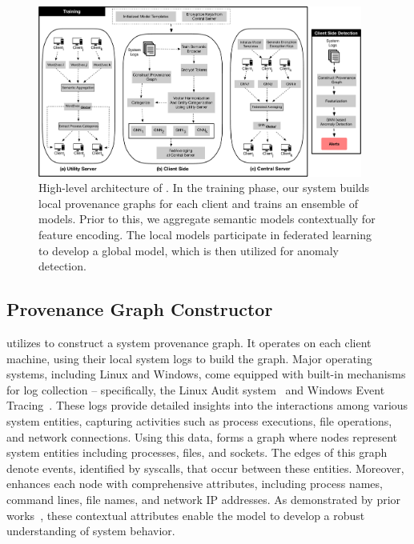 
\begin{figure}[t!]
  \centering
  \includegraphics[width=0.95\textwidth]{fig/archv3.pdf}
  \caption{High-level architecture of \Sys. In the training phase, our system builds local provenance graphs for each client and trains an ensemble of \gnnshort models. Prior to this, we aggregate semantic models contextually for feature encoding. The local \gnnshort models participate in federated learning to develop a global \gnnshort model, which is then utilized for anomaly detection.}
  \vspace{-3ex}
  \label{fig:arch}
\end{figure}

\subsection{Provenance Graph Constructor} 
\label{provconstruct}
\Sys utilizes \logs to construct a system provenance graph. It operates on each client machine, using their local system logs to build the graph. Major operating systems, including Linux and Windows, come equipped with built-in mechanisms for log collection -- specifically, the Linux Audit system~\cite{linuxaudit} and Windows Event Tracing~\cite{windowsaudit}. These logs provide detailed insights into the interactions among various system entities, capturing activities such as process executions, file operations, and network connections. Using this data, \Sys forms a graph where nodes represent system entities including processes, files, and sockets. The edges of this graph denote events, identified by syscalls, that occur between these entities. Moreover, \Sys enhances each node with comprehensive attributes, including process names, command lines, file names, and network IP addresses. As demonstrated by prior works~\cite{flash2024,cheng2023kairos}, these contextual attributes enable the model to develop a robust understanding of system behavior.

